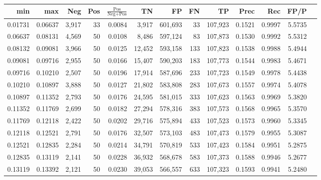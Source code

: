 \begin{tabular}{rrrrrrrrrrrrr}
\toprule
    min &     max &   Neg & Pos & $\frac{\text{Pos}}{\text{Neg}+\text{Pos}}$ &      TN &      FP &      FN &      TP &   Prec &    Rec &   FP/P \\
\midrule
0.01731 & 0.06637 & 3,917 &  33 &                                     0.0084 &   3,917 & 601,693 &      33 & 107,923 & 0.1521 & 0.9997 & 5.5735 \\
0.06637 & 0.08131 & 4,569 &  50 &                                     0.0108 &   8,486 & 597,124 &      83 & 107,873 & 0.1530 & 0.9992 & 5.5312 \\
0.08132 & 0.09081 & 3,966 &  50 &                                     0.0125 &  12,452 & 593,158 &     133 & 107,823 & 0.1538 & 0.9988 & 5.4944 \\
0.09081 & 0.09716 & 2,955 &  50 &                                     0.0166 &  15,407 & 590,203 &     183 & 107,773 & 0.1544 & 0.9983 & 5.4671 \\
0.09716 & 0.10210 & 2,507 &  50 &                                     0.0196 &  17,914 & 587,696 &     233 & 107,723 & 0.1549 & 0.9978 & 5.4438 \\
0.10210 & 0.10897 & 3,888 &  50 &                                     0.0127 &  21,802 & 583,808 &     283 & 107,673 & 0.1557 & 0.9974 & 5.4078 \\
0.10897 & 0.11352 & 2,793 &  50 &                                     0.0176 &  24,595 & 581,015 &     333 & 107,623 & 0.1563 & 0.9969 & 5.3820 \\
0.11352 & 0.11769 & 2,699 &  50 &                                     0.0182 &  27,294 & 578,316 &     383 & 107,573 & 0.1568 & 0.9965 & 5.3570 \\
0.11769 & 0.12118 & 2,422 &  50 &                                     0.0202 &  29,716 & 575,894 &     433 & 107,523 & 0.1573 & 0.9960 & 5.3345 \\
0.12118 & 0.12521 & 2,791 &  50 &                                     0.0176 &  32,507 & 573,103 &     483 & 107,473 & 0.1579 & 0.9955 & 5.3087 \\
0.12521 & 0.12835 & 2,284 &  50 &                                     0.0214 &  34,791 & 570,819 &     533 & 107,423 & 0.1584 & 0.9951 & 5.2875 \\
0.12835 & 0.13119 & 2,141 &  50 &                                     0.0228 &  36,932 & 568,678 &     583 & 107,373 & 0.1588 & 0.9946 & 5.2677 \\
0.13119 & 0.13392 & 2,121 &  50 &                                     0.0230 &  39,053 & 566,557 &     633 & 107,323 & 0.1593 & 0.9941 & 5.2480 \\

\end{tabular}
